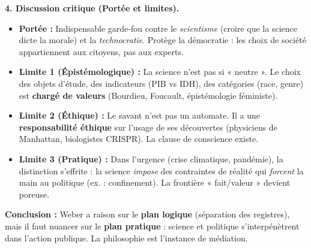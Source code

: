 \documentclass[11pt]{article}
\begin{document}
\begin{exoresolu}
\textbf{4. Discussion critique (Portée et limites).}
\begin{itemize}
    \item \textbf{Portée :} Indispensable garde-fou contre le \emph{scientisme} (croire que la science dicte la morale) et la \emph{technocratie}. Protège la démocratie : les choix de société appartiennent aux citoyens, pas aux experts.
    \item \textbf{Limite 1 (Épistémologique) :} La science n'est pas si « neutre ». Le choix des objets d'étude, des indicateurs (PIB vs IDH), des catégories (race, genre) est \textbf{chargé de valeurs} (Bourdieu, Foucault, épistémologie féministe).
    \item \textbf{Limite 2 (Éthique) :} Le savant n'est pas un automate. Il a une \textbf{responsabilité éthique} sur l'usage de ses découvertes (physiciens de Manhattan, biologistes CRISPR). La clause de conscience existe.
    \item \textbf{Limite 3 (Pratique) :} Dans l'urgence (crise climatique, pandémie), la distinction s'effrite : la science \emph{impose} des contraintes de réalité qui \emph{forcent} la main au politique (ex. : confinement). La frontière « fait/valeur » devient poreuse.
\end{itemize}

\textbf{Conclusion :} Weber a raison sur le \textbf{plan logique} (séparation des registres), mais il faut nuancer sur le \textbf{plan pratique} : science et politique s'interpénètrent dans l'action publique. La philosophie est l'instance de médiation.
\end{exoresolu}
\end{document}
